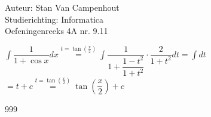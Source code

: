 \documentclass[a4paper]{article}
\begin{document}
  
\noindent \large Auteur: Stan Van Campenhout \\
\noindent \large Studierichting:  Informatica\\
\noindent \large Oefeningenreeks 4A nr. 9.11\\

\medskip

\normalsize

$ \displaystyle\int \dfrac{1}{1+\cos x} dx \stackrel{t = \tan\left(\tfrac{x}{2}\right)}{=} \displaystyle\int\dfrac{1}{1+\dfrac{1-t^2}{1+t^2}}\cdot\dfrac{2}{1+t^2}dt
= \displaystyle\int dt $\\

$ = t + c \stackrel{t = \tan\left(\tfrac{x}{2}\right)}{=} \tan\left(\dfrac{x}{2}\right) + c $\\

\begin{thebibliography}{999}
\end{thebibliography}
\end{document}
